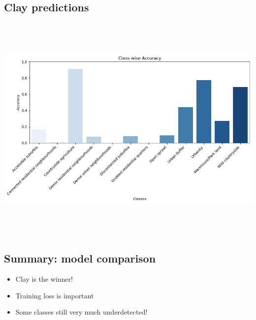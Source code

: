 \documentclass[
  letterpaper,
  DIV=11,
  numbers=noendperiod]{scrartcl}
\providecommand{\tightlist}{%
  \setlength{\itemsep}{0pt}\setlength{\parskip}{0pt}}\usepackage{longtable,booktabs,array}
\begin{document}
\subsection{Clay predictions}\label{clay-predictions}

\begin{center}
\includegraphics[width=\textwidth,height=4.47917in]{../figures/algo_design/class_acc.png}
\end{center}

\subsection{Summary: model comparison}\label{summary-model-comparison}

\begin{itemize}
\tightlist
\item
  Clay is the winner!
\item
  Training loss is important
\item
  Some classes still very much underdetected!
\end{itemize}
\end{document}
